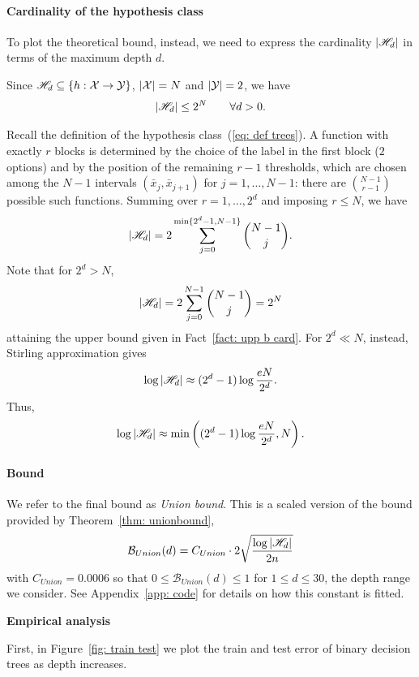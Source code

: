 \documentclass[reqno]{amsart}
\begin{document}
\paragraph{Cardinality of the hypothesis class} To plot the theoretical bound, instead, we need to express the cardinality $\vert \mathscr{H}_d\vert$ in terms of the maximum depth $d$. 
\begin{fact}\label{fact: upp b card}
Since $\mathscr{H}_d \subseteq \{h:\mathcal{X} \to \mathcal{Y}\}$, $\vert \mathcal{X}\vert = N$ and $\vert \mathcal{Y} \vert = 2$, we have 
\[
\vert \mathscr{H}_d\vert \le 2^N \qquad \forall d>0.
\]
\end{fact}
Recall the definition of the hypothesis class~(\ref{eq: def trees}). A function with exactly $r$ blocks is determined by the choice of the label in the first block ($2$ options) and by the position of the remaining $r-1$ thresholds, which are chosen among the $N-1$ intervals $(\bar x_j, \bar x_{j+1})$ for $j =1,\ldots, N-1$: there are $\binom{N-1}{r-1}$ possible such functions. Summing over $r = 1,\ldots, 2^d$ and imposing $r\le N$, we have
\[
\vert \mathscr{H}_d\vert = 2 \sum_{j = 0}^{\min\{2^d -1, N-1\}}\binom{N-1}{j}.
\]
Note that for $2^d > N$, 
\[
\vert \mathscr{H}_d\vert = 2 \sum_{j = 0}^{ N-1}\binom{N-1}{j} = 2^N
\]
attaining the upper bound given in Fact~\ref{fact: upp b card}. For $2^d \ll N$, instead, Stirling approximation gives
\[
\log \vert\mathscr{H}_d\vert \approx (2^d -1) \log\frac{eN}{2^d}.
\]
Thus,
\begin{equation}\label{eq: log Hd}
\log \vert\mathscr{H}_d\vert \approx \min \left((2^d -1) \log\frac{eN}{2^d}, N\right). 
\end{equation}

\paragraph{Bound} We refer to the final bound as {\it Union bound}. This is a scaled version of the bound provided by Theorem~\ref{thm: unionbound},
\begin{equation}\label{eq: union bound}
\mathcal B_{{Union}} (d) = C_{Union} \cdot 2\sqrt{\frac{\log \vert \mathscr{H}_d \vert}{2n}}
\end{equation}
with $C_{Union} = 0.0006$ so that $0\le \mathcal B_{Union} (d) \le 1$ for $1\le d \le 30$, the depth range we consider. See Appendix~\ref{app: code} for details on how this constant is fitted. 


{\bf Empirical analysis}

First, in Figure~\ref{fig: train test} we plot the train and test error of binary decision trees as depth increases.
\end{document}
